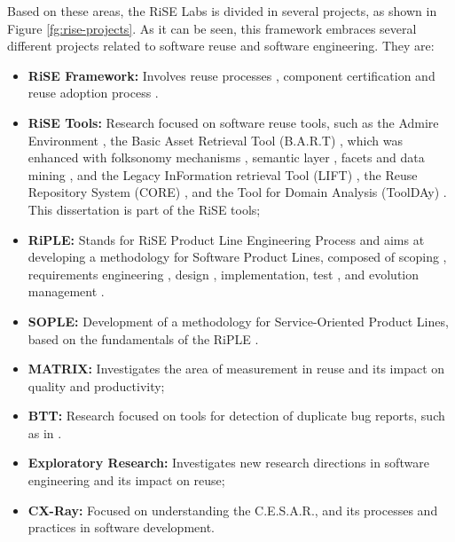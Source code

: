 Based on these areas, the RiSE Labs is divided in several projects, as shown in
Figure \ref{fg:rise-projects}. As it can be seen, this framework embraces
several different projects related to software reuse and software engineering.
They are:

\begin{itemize}
  \item \textbf{RiSE Framework:} Involves reuse processes
  \citep{Almeida2004,Nascimento2008}, component certification
  \citep{Alvaro2006} and reuse adoption process \citep{Garcia2008a}.
  
   \item \textbf{RiSE Tools:} Research focused on software reuse tools, such
   as the Admire Environment \citep{Mascena2006}, the Basic Asset Retrieval
   Tool (B.A.R.T) \citep{Santos2006}, which was enhanced with folksonomy
   mechanisms \citep{Vanderlei2007}, semantic layer \citep{Durao2008},
   facets \citep{Mendes2008} and data mining \citep{Martins2008}, and the
   Legacy InFormation retrieval Tool (LIFT) \citep{Brito2007}, the
   Reuse Repository System (CORE) \citep{CoreICSR}, and the Tool for Domain
   Analysis (ToolDAy) \citep{lisboa:msc:2008}. This dissertation is part of the RiSE tools;
   
   \item \textbf{RiPLE:}  Stands for RiSE Product Line Engineering Process and aims at developing   a methodology for Software Product Lines, composed of scoping \citep{Moraes2010},   requirements engineering \citep{neiva:msc:2009}, design \citep{filho:msc:2010,Cavalcanti:2011:ERP:2000259.2000286} , implementation, test \citep{neto:msc:2010,machado:msc:2010}, and evolution  management \citep{oliveira2009}.
   
   
   
   \item \textbf{SOPLE:} Development of a methodology for Service-Oriented Product Lines, based on the fundamentals of the RiPLE \citep{ribeiro2010}. 
   
   
   \item \textbf{MATRIX:} Investigates the area of measurement in reuse and
   its impact on quality and productivity;
   
   \item \textbf{BTT:} Research focused on tools for detection of duplicate
   bug reports, such as in \citet{CavalcantiFISL2008,CavalcantiInTech2012}.
   
   \item \textbf{Exploratory Research:} Investigates new research directions
   in software engineering and its impact on reuse;

   \item \textbf{CX-Ray:} Focused on understanding the \ac{C.E.S.A.R.}, and its
   processes and practices in software development.
\end{itemize}

